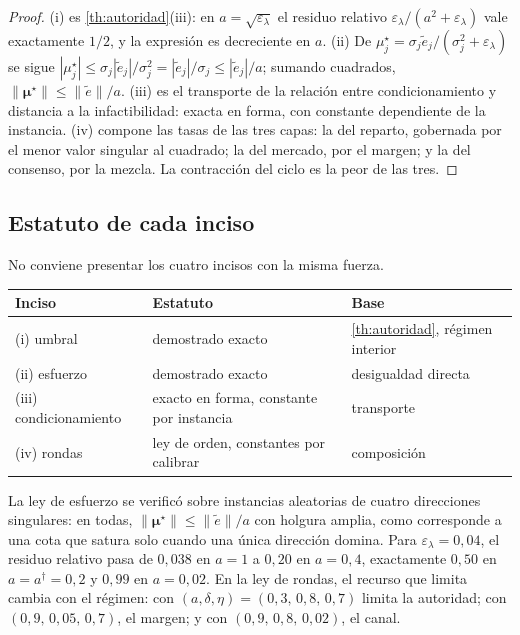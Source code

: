 \begin{proof}
(i) es \cref{th:autoridad}(iii): en $a=\sqrt{\varepsilon_\lambda}$ el residuo
relativo $\varepsilon_\lambda/(a^{2}+\varepsilon_\lambda)$ vale exactamente
$1/2$, y la expresión es decreciente en $a$.
(ii) De $\mu_j^{\star}=\sigma_j\tilde e_j/(\sigma_j^{2}+\varepsilon_\lambda)$ se
sigue $|\mu_j^{\star}|\le\sigma_j|\tilde e_j|/\sigma_j^{2}=|\tilde e_j|/\sigma_j\le|\tilde e_j|/a$;
sumando cuadrados, $\lVert\bm\mu^\star\rVert\le\lVert\tilde e\rVert/a$.
(iii) es el transporte de la relación entre condicionamiento y distancia a la
infactibilidad: exacta en forma, con constante dependiente de la
instancia.
(iv) compone las tasas de las tres capas: la del reparto, gobernada por el
menor valor singular al cuadrado; la del mercado, por el margen; y la del
consenso, por la mezcla. La contracción del ciclo es la peor de las tres.
\end{proof}

\subsection{Estatuto de cada inciso}

No conviene presentar los cuatro incisos con la misma fuerza.

\begin{center}\small
\begin{tabular}{@{}lll@{}}
\toprule
Inciso & Estatuto & Base \\
\midrule
(i) umbral & demostrado exacto & \cref{th:autoridad}, régimen interior \\
(ii) esfuerzo & demostrado exacto & desigualdad directa \\
(iii) condicionamiento & exacto en forma, constante por instancia & transporte \\
(iv) rondas & ley de orden, constantes por calibrar & composición \\
\bottomrule
\end{tabular}
\end{center}

\begin{observacion}
\label{obs:degradacion-num}
La ley de esfuerzo se verificó sobre instancias aleatorias de cuatro direcciones
singulares: en todas, $\lVert\bm\mu^\star\rVert\le\lVert\tilde e\rVert/a$ con
holgura amplia, como corresponde a una cota que satura solo cuando una única
dirección domina. Para $\varepsilon_\lambda=0{,}04$, el residuo relativo pasa de
$0{,}038$ en $a=1$ a $0{,}20$ en $a=0{,}4$, exactamente $0{,}50$ en
$a=a^\dagger=0{,}2$ y $0{,}99$ en $a=0{,}02$. En la ley de rondas, el recurso
que limita cambia con el régimen: con $(a,\delta,\eta)=(0{,}3,\,0{,}8,\,0{,}7)$
limita la autoridad; con $(0{,}9,\,0{,}05,\,0{,}7)$, el margen; y con
$(0{,}9,\,0{,}8,\,0{,}02)$, el canal.
\end{observacion}

